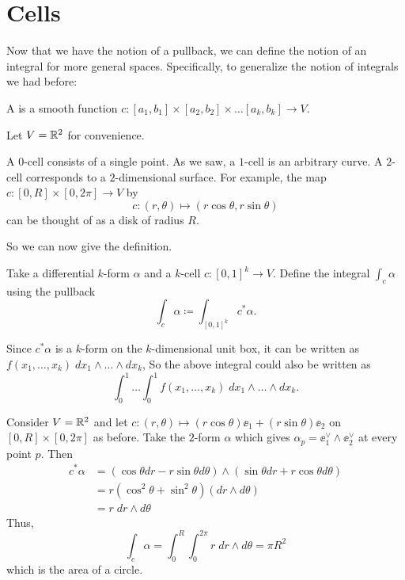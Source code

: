 \section{Cells}
Now that we have the notion of a pullback,
we can define the notion of an integral for more general spaces.
Specifically, to generalize the notion of integrals we had before:
\begin{definition}
	A  is a smooth function $c \colon [a_1, b_1] \times [a_2,b_2] \times \dots [a_k, b_k] \to V$.
\end{definition}
\begin{example}
	Let $V = \mathbb R^2$ for convenience.
	\begin{enumerate}[(a)]
		\ii A $0$-cell consists of a single point.
		\ii As we saw, a $1$-cell is an arbitrary curve.
		\ii A $2$-cell corresponds to a $2$-dimensional surface.
		For example, the map $c \colon [0,R] \times [0,2\pi] \to V$ by
		\[ c \colon (r,\theta) \mapsto (r\cos\theta, r\sin\theta) \]
		can be thought of as a disk of radius $R$.
	\end{enumerate}
\end{example}
So we can now give the definition.
\begin{definition}
	Take a differential $k$-form $\alpha$ and a $k$-cell $c \colon [0,1]^k \to V$.
	Define the integral $\int_c \alpha$ using the pullback
	\[ \int_c \alpha \coloneqq \int_{[0,1]^k} c^\ast \alpha. \]
\end{definition}
Since $c^\ast \alpha$ is a $k$-form on the $k$-dimensional unit box,
it can be written as $f(x_1, \dots, x_k) \; dx_1 \wedge \dots \wedge dx_k$,
So the above integral could also be written as
\[ \int_0^1 \dots \int_0^1 f(x_1, \dots, x_k) \; dx_1 \wedge \dots \wedge dx_k. \]

\begin{example}
	\label{ex:area_circle}
	Consider $V = \mathbb R^2$ and let $c \colon (r,\theta) \mapsto (r\cos\theta)\ee_1 + (r\sin\theta)\ee_2$
	on $[0,R] \times [0,2\pi]$ as before.
	Take the $2$-form $\alpha$ which gives $\alpha_p = \ee_1^\vee \wedge \ee_2^\vee$ at every point $p$.
	Then
	\begin{align*}
		c^\ast\alpha &=
		\left( \cos\theta dr - r\sin\theta d\theta \right)
		\wedge
		\left( \sin\theta dr + r\cos\theta d\theta \right) \\
		&= r(\cos^2\theta+\sin^2\theta) (dr \wedge d\theta) \\
		&= r \; dr \wedge d\theta
	\end{align*}
	Thus,
	\[ \int_c \alpha
		= \int_0^R \int_0^{2\pi} r \; dr \wedge d\theta
		= \pi R^2 \]
	which is the area of a circle.
\end{example}

